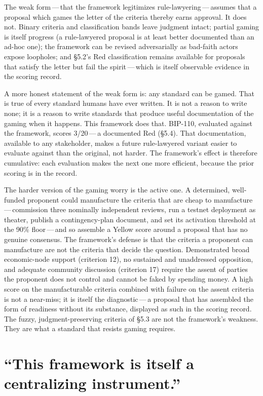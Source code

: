 \documentclass[11pt, twoside, openright]{book}
\newcommand{\sect}[1]{\S#1}
\begin{document}
The weak form\,---\,that the framework legitimizes rule-lawyering\,---\,assumes that a proposal which games the letter of the criteria thereby earns approval. It does not. Binary criteria and classification bands leave judgment intact; partial gaming is itself progress (a rule-lawyered proposal is at least better documented than an ad-hoc one); the framework can be revised adversarially as bad-faith actors expose loopholes; and \sect{5.2}'s Red classification remains available for proposals that satisfy the letter but fail the spirit\,---\,which is itself observable evidence in the scoring record.

A more honest statement of the weak form is: any standard can be gamed. That is true of every standard humans have ever written. It is not a reason to write none; it is a reason to write standards that produce useful documentation of the gaming when it happens. This framework does that. BIP-110, evaluated against the framework, scores 3/20\,---\,a documented Red (\sect{5.4}). That documentation, available to any stakeholder, makes a future rule-lawyered variant easier to evaluate against than the original, not harder. The framework's effect is therefore cumulative: each evaluation makes the next one more efficient, because the prior scoring is in the record.

The harder version of the gaming worry is the active one. A determined, well-funded proponent could manufacture the criteria that are cheap to manufacture\,---\,commission three nominally independent reviews, run a testnet deployment as theater, publish a contingency-plan document, and set its activation threshold at the 90\% floor\,---\,and so assemble a Yellow score around a proposal that has no genuine consensus. The framework's defense is that the criteria a proponent can manufacture are not the criteria that decide the question. Demonstrated broad economic-node support (criterion 12), no sustained and unaddressed opposition, and adequate community discussion (criterion 17) require the assent of parties the proponent does not control and cannot be faked by spending money. A high score on the manufacturable criteria combined with failure on the assent criteria is not a near-miss; it is itself the diagnostic\,---\,a proposal that has assembled the form of readiness without its substance, displayed as such in the scoring record. The fuzzy, judgment-preserving criteria of \sect{5.3} are not the framework's weakness. They are what a standard that resists gaming requires.

\section{\texorpdfstring{``This framework is itself a centralizing instrument.''}{\textquotedblleft This framework is itself a centralizing instrument.\textquotedblright}}
\end{document}
